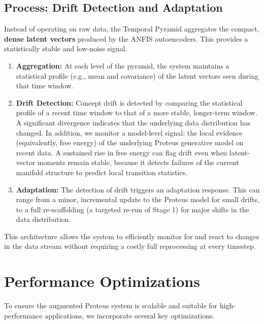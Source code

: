 \documentclass{article}
\begin{document}
\subsection{Process: Drift Detection and Adaptation}
Instead of operating on raw data, the Temporal Pyramid aggregates the compact, \textbf{dense latent vectors} produced by the ANFIS autoencoders. This provides a statistically stable and low-noise signal.
\begin{enumerate}
    \item \textbf{Aggregation:} At each level of the pyramid, the system maintains a statistical profile (e.g., mean and covariance) of the latent vectors seen during that time window.
    \item \textbf{Drift Detection:} Concept drift is detected by comparing the statistical profile of a recent time window to that of a more stable, longer-term window. A significant divergence indicates that the underlying data distribution has changed. In addition, we monitor a model-level signal: the local evidence (equivalently, free energy) of the underlying Proteus generative model on recent data. A sustained rise in free energy can flag drift even when latent-vector moments remain stable, because it detects failures of the current manifold structure to predict local transition statistics.
    \item \textbf{Adaptation:} The detection of drift triggers an adaptation response. This can range from a minor, incremental update to the Proteus model for small drifts, to a full re-scaffolding (a targeted re-run of Stage 1) for major shifts in the data distribution.
\end{enumerate}
This architecture allows the system to efficiently monitor for and react to changes in the data stream without requiring a costly full reprocessing at every timestep.

\section{Performance Optimizations}

To ensure the augmented Proteus system is scalable and suitable for high-performance applications, we incorporate several key optimizations.
\end{document}
